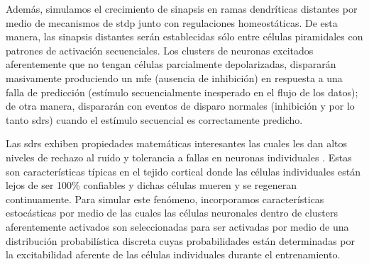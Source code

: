 
Además, simulamos el crecimiento de sinapsis en ramas dendríticas distantes por medio de mecanismos de \gls{stdp} junto con regulaciones homeostáticas. De esta manera, las sinapsis distantes  serán establecidas sólo entre células piramidales con patrones de activación secuenciales. Los clusters de neuronas excitados aferentemente que no tengan células parcialmente depolarizadas, dispararán masivamente produciendo un \gls{mfe} (ausencia de inhibición) en respuesta a una falla de predicción (estímulo secuencialmente inesperado en el flujo de los datos); de otra manera, dispararán con eventos de disparo normales (inhibición y por lo tanto \glspl{sdr}) cuando el estímulo secuencial es correctamente predicho.


Las \glspl{sdr} exhiben propiedades matemáticas interesantes las cuales les dan altos niveles de rechazo al ruido y tolerancia a fallas en neuronas individuales \cite{ahmad_2015}. Estas son características típicas en el tejido cortical donde las células individuales están lejos de ser 100\% confiables y dichas células mueren y se regeneran continuamente. Para simular este fenómeno, incorporamos características estocásticas por medio de las cuales las células neuronales dentro de clusters aferentemente activados son seleccionadas para ser activadas por medio de una distribución probabilística discreta cuyas probabilidades están determinadas por la excitabilidad aferente de las células individuales durante el entrenamiento.

